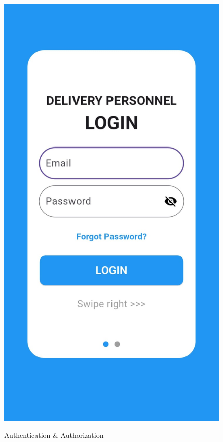 \begin{figure}[H]
\begin{minipage}{0.3\textwidth}
    \includegraphics[width=\linewidth]{4/Mobile_login.jpg}
    \label{fig:authentication2}
\end{minipage}
\caption{Authentication \& Authorization}
\label{fig:authentication_combined}
\end{figure}
